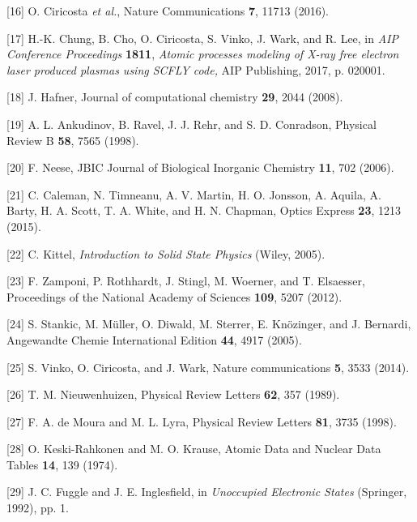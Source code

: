 {[}16{]} O. Ciricosta \emph{et al.}, Nature Communications \textbf{7},
11713 (2016).

{[}17{]} H.-K. Chung, B. Cho, O. Ciricosta, S. Vinko, J. Wark, and R.
Lee, in \emph{AIP Conference Proceedings} \textbf{1811}, \emph{Atomic
processes modeling of X-ray free electron laser produced plasmas using
SCFLY code,} AIP Publishing, 2017, p. 020001.

{[}18{]} J. Hafner, Journal of computational chemistry \textbf{29}, 2044
(2008).

{[}19{]} A. L. Ankudinov, B. Ravel, J. J. Rehr, and S. D. Conradson,
Physical Review B \textbf{58}, 7565 (1998).

{[}20{]} F. Neese, JBIC Journal of Biological Inorganic Chemistry
\textbf{11}, 702 (2006).

{[}21{]} C. Caleman, N. Timneanu, A. V. Martin, H. O. Jonsson, A.
Aquila, A. Barty, H. A. Scott, T. A. White, and H. N. Chapman, Optics
Express \textbf{23}, 1213 (2015).

{[}22{]} C. Kittel, \emph{Introduction to Solid State Physics} (Wiley,
2005).

{[}23{]} F. Zamponi, P. Rothhardt, J. Stingl, M. Woerner, and T.
Elsaesser, Proceedings of the National Academy of Sciences \textbf{109},
5207 (2012).

{[}24{]} S. Stankic, M. Müller, O. Diwald, M. Sterrer, E. Knözinger, and
J. Bernardi, Angewandte Chemie International Edition \textbf{44}, 4917
(2005).

{[}25{]} S. Vinko, O. Ciricosta, and J. Wark, Nature communications
\textbf{5}, 3533 (2014).

{[}26{]} T. M. Nieuwenhuizen, Physical Review Letters \textbf{62}, 357
(1989).

{[}27{]} F. A. de Moura and M. L. Lyra, Physical Review Letters
\textbf{81}, 3735 (1998).

{[}28{]} O. Keski-Rahkonen and M. O. Krause, Atomic Data and Nuclear
Data Tables \textbf{14}, 139 (1974).

{[}29{]} J. C. Fuggle and J. E. Inglesfield, in \emph{Unoccupied
Electronic States} (Springer, 1992), pp. 1.




